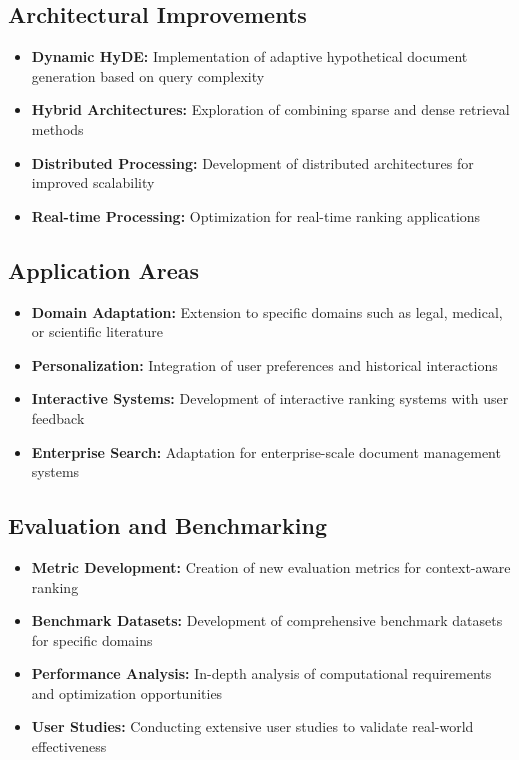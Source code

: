 \subsection{Architectural Improvements}
\begin{itemize}
    \item \textbf{Dynamic HyDE:} Implementation of adaptive hypothetical document generation based on query complexity
    \item \textbf{Hybrid Architectures:} Exploration of combining sparse and dense retrieval methods
    \item \textbf{Distributed Processing:} Development of distributed architectures for improved scalability
    \item \textbf{Real-time Processing:} Optimization for real-time ranking applications
\end{itemize}

\subsection{Application Areas}
\begin{itemize}
    \item \textbf{Domain Adaptation:} Extension to specific domains such as legal, medical, or scientific literature
    \item \textbf{Personalization:} Integration of user preferences and historical interactions
    \item \textbf{Interactive Systems:} Development of interactive ranking systems with user feedback
    \item \textbf{Enterprise Search:} Adaptation for enterprise-scale document management systems
\end{itemize}

\subsection{Evaluation and Benchmarking}
\begin{itemize}
    \item \textbf{Metric Development:} Creation of new evaluation metrics for context-aware ranking
    \item \textbf{Benchmark Datasets:} Development of comprehensive benchmark datasets for specific domains
    \item \textbf{Performance Analysis:} In-depth analysis of computational requirements and optimization opportunities
    \item \textbf{User Studies:} Conducting extensive user studies to validate real-world effectiveness
\end{itemize}


